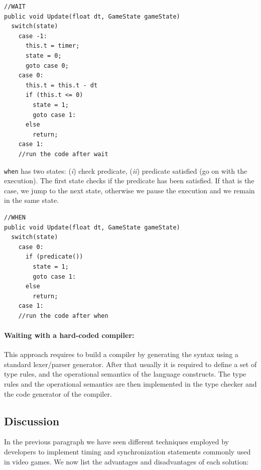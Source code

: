 \begin{lstlisting}
//WAIT
public void Update(float dt, GameState gameState)
  switch(state)
    case -1: 
      this.t = timer;
      state = 0;
      goto case 0;
    case 0:
      this.t = this.t - dt
      if (this.t <= 0)
        state = 1;
        goto case 1:
      else
        return;
    case 1:
    //run the code after wait
\end{lstlisting}

\texttt{when} has two states: (\textit{i}) check predicate, (\textit{ii}) predicate satisfied (go on with the execution). The first state checks if the predicate has been satisfied. If that is the case, we jump to the next state, otherwise we pause the execution and we remain in the same state.

\begin{lstlisting}
//WHEN
public void Update(float dt, GameState gameState)
  switch(state)
    case 0:
      if (predicate())
        state = 1;
        goto case 1:
      else
        return;
    case 1:
    //run the code after when
\end{lstlisting}

\paragraph{Waiting with a hard-coded compiler:} This approach requires to build a compiler by generating the syntax using a standard lexer/parser generator. After that usually it is required to define a set of type rules, and the operational semantics of the language constructs. The type rules and the operational semantics are then implemented in the type checker and the code generator of the compiler.

\subsection{Discussion}
In the previous paragraph we have seen different techniques employed by developers to implement timing and synchronization statements commonly used in video games. We now list the advantages and disadvantages of each solution:

